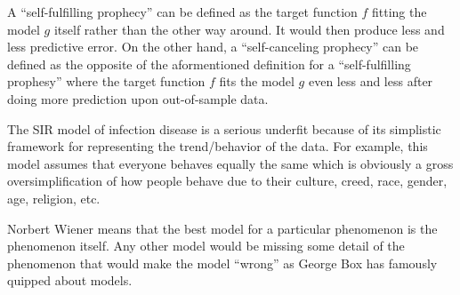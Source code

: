 \documentclass[12pt]{article}
\begin{document}
\begin{enumerate}

\begin{tcolorbox}[colback=white, sharp corners]
A ``self-fulfilling prophecy'' can be defined as the target function $f$ fitting the model $g$ itself rather than the other way around. It would then produce less and less predictive error. On the other hand, a ``self-canceling prophecy'' can be defined as the opposite of the aformentioned definition for a ``self-fulfilling prophesy'' where the target function $f$ fits the model $g$ even less and less after doing more prediction upon out-of-sample data. 
\end{tcolorbox}



\begin{tcolorbox}[colback=white, sharp corners]
The SIR model of infection disease is a serious underfit because of its simplistic framework for representing the trend/behavior of the data. For example, this model assumes that everyone behaves equally the same which is obviously a gross oversimplification of how people behave due to their culture, creed, race, gender, age, religion, etc. 
\end{tcolorbox}



\begin{tcolorbox}[colback=white, sharp corners]
Norbert Wiener means that the best model for a particular phenomenon is the phenomenon itself. Any other model would be missing some detail of the phenomenon that would make the model ``wrong'' as George Box has famously quipped about models. 
\end{tcolorbox}


\end{enumerate}
\end{document}
